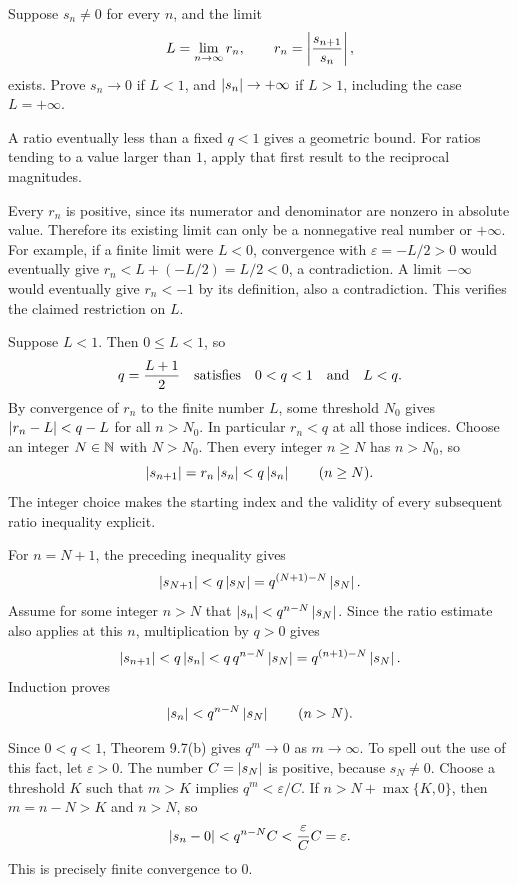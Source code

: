 

\goal Suppose $s_n\ne0$ for every $n$, and the limit
\[
 L=\lim_{n\to\infty}r_n,
 \qquad r_n=\left|\frac{s_{n+1}}{s_n}\right|,
\]
exists. Prove $s_n\to0$ if $L<1$, and
$\left|s_n\right|\to+\infty$ if $L>1$, including the case
$L=+\infty$.

\idea A ratio eventually less than a fixed $q<1$ gives a
geometric bound. For ratios tending to a value larger than $1$,
apply that first result to the reciprocal magnitudes.

Every $r_n$ is positive, since its numerator and denominator are
nonzero in absolute value. Therefore its existing limit can only
be a nonnegative real number or $+\infty$.
For example, if a finite limit were $L<0$, convergence with
$\varepsilon=-L/2>0$ would eventually give
$r_n<L+(-L/2)=L/2<0$, a contradiction. A limit $-\infty$
would eventually give $r_n<-1$ by its definition, also a
contradiction. This verifies the claimed restriction on $L$.

Suppose $L<1$. Then $0\leq L<1$, so
\[
 q=\frac{L+1}{2}
 \quad\hbox{satisfies}\quad 0<q<1\quad\hbox{and}\quad L<q.
\]
By convergence of $r_n$ to the finite number $L$, some threshold
$N_0$ gives $\left|r_n-L\right|<q-L$ for all $n>N_0$.
In particular $r_n<q$ at all those indices.
Choose an integer $N\in\mathbb{N}$ with $N>N_0$.
Then every integer $n\geq N$ has $n>N_0$, so
\[
 \left|s_{n+1}\right|=r_n\left|s_n\right|<q\left|s_n\right|
 \qquad(n\geq N).
\]
The integer choice makes the starting index and the validity of
every subsequent ratio inequality explicit.

For $n=N+1$, the preceding inequality gives
\[
 \left|s_{N+1}\right|<q\left|s_N\right|=q^{(N+1)-N}\left|s_N\right|.
\]
Assume for some integer $n>N$ that
$\left|s_n\right|<q^{n-N}\left|s_N\right|$. Since the ratio estimate
also applies at this $n$, multiplication by $q>0$ gives
\[
 \left|s_{n+1}\right|<q\left|s_n\right|
 <q\,q^{n-N}\left|s_N\right|
 =q^{(n+1)-N}\left|s_N\right|.
\]
Induction proves
\[
 \left|s_n\right|<q^{n-N}\left|s_N\right|\qquad(n>N).
\]

Since $0<q<1$, Theorem 9.7(b) gives $q^m\to0$ as
$m\to\infty$. To spell out the use of this fact, let
$\varepsilon>0$. The number $C=\left|s_N\right|$ is positive,
because $s_N\ne0$. Choose a threshold $K$ such that
$m>K$ implies $q^m<\varepsilon/C$.
If $n>N+\max\{K,0\}$, then $m=n-N>K$ and $n>N$,
so
\[
 \left|s_n-0\right|<q^{n-N}C<\frac{\varepsilon}{C}C
 =\varepsilon.
\]
This is precisely finite convergence to $0$.

